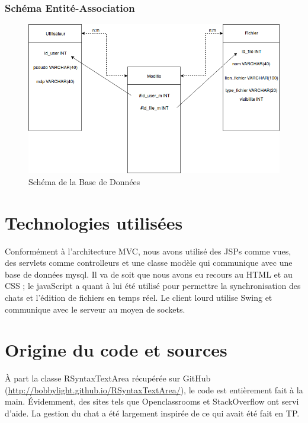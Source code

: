 \documentclass[a4paper, 12pt]{article}
\begin{document}
\subsubsection{Schéma Entité-Association}

\begin{figure}[H]
  \begin{center}
    \includegraphics[scale=0.4]{entite_association.png}
  \end{center}
  \caption{Schéma de la Base de Données}
\end{figure}


\section{Technologies utilisées}

Conformément à l'architecture MVC, nous avons utilisé des JSPs comme vues, des servlets comme controlleurs et une classe modèle qui communique avec une base de données mysql. Il va de soit que nous avons eu recours au HTML et au CSS ; le javaScript a quant à lui été utilisé pour permettre la synchronisation des chats et l'édition de fichiers en temps réel. Le client lourd utilise Swing et communique avec le serveur au moyen de sockets.


\section{Origine du code et sources}

À part la classe RSyntaxTextArea récupérée sur GitHub (\url{http://bobbylight.github.io/RSyntaxTextArea/}), le code est entièrement fait à la main. Évidemment, des sites tels que Openclassrooms et StackOverflow ont servi d'aide. La gestion du chat a été largement inspirée de ce qui avait été fait en TP.
\end{document}
